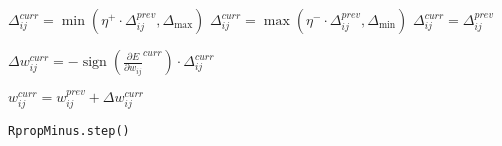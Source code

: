 \begin{algorithm}
    \BlankLine
    \BlankLine

     { \BlankLine
         { \BlankLine
            $\Delta_{ij}^{curr} = \min(\eta^{+} \cdot \Delta_{ij}^{prev}, \Delta_{\max})$
        }
         { \BlankLine
            $\Delta_{ij}^{curr} = \max(\eta^{-} \cdot \Delta_{ij}^{prev}, \Delta_{\min})$
        }
         { \BlankLine
            $\Delta_{ij}^{curr} = \Delta_{ij}^{prev}$
        } \BlankLine

        $\Delta w_{ij}^{curr} = -\operatorname{sign}(\frac{\partial E}{\partial w_{ij}}^{curr}) \cdot \Delta_{ij}^{curr}$ \BlankLine

        $w_{ij}^{curr} = w_{ij}^{prev} + \Delta w_{ij}^{curr}$
    }

    \caption{\texttt{RpropMinus.step()}}
    \label{alg:rpropminus}
\end{algorithm}